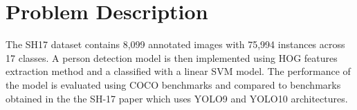 \section{Problem Description}

The SH17 dataset contains 8,099 annotated images with 75,994 instances across 17 classes. 
A person detection model is then implemented using HOG features extraction method and a classified with a linear SVM model.
The performance of the model is evaluated using COCO benchmarks and compared to benchmarks obtained in the the SH-17 paper which uses YOLO9 and YOLO10 architectures.